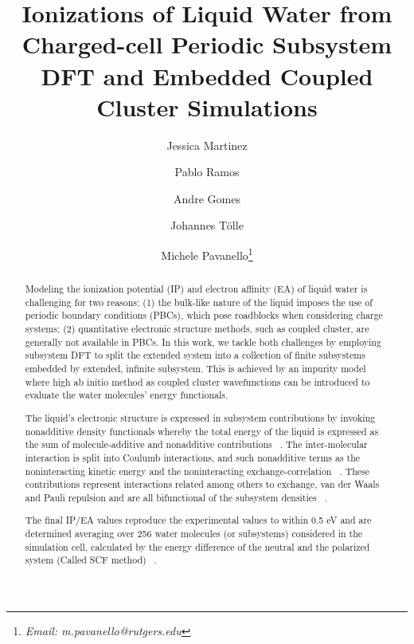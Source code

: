 \documentclass[12pt,a4paper]{article}
\begin{document}
\title{Ionizations of Liquid Water from Charged-cell Periodic Subsystem DFT and Embedded Coupled Cluster Simulations}
\author[1]{Jessica Martinez}
\author[1]{Pablo Ramos}
\author[2]{Andre Gomes}
\author[3]{Johannes Tölle}
\author[1]{Michele Pavanello\thanks{\textit{Email: m.pavanello@rutgers.edu}}}
\date{}
\setcounter{Maxaffil}{0}
\renewcommand\Affilfont{\itshape\small}
\begin{titlepage}
  \maketitle
\end{titlepage}

\begin{abstract}
Modeling the ionization potential (IP) and electron affinity (EA) of liquid water is challenging for
two reasons: (1) the bulk-like nature of the liquid imposes the use of periodic boundary conditions
(PBCs), which pose roadblocks when considering charge systems; (2) quantitative electronic structure
methods, such as coupled cluster, are generally not available in PBCs. In this work, we tackle both
challenges by employing subsystem DFT to split the extended system into a collection of finite
subsystems embedded by extended, infinite subsystem. This is achieved by an impurity
model ~\cite{tolle2019charged} where high ab initio method as coupled cluster wavefunctions can be introduced to evaluate
the water molecules’ energy functionals. 

The liquid’s electronic structure is expressed in subsystem contributions by invoking nonadditive density 
functionals whereby the total energy of the liquid is expressed as the sum of molecule-additive
and nonadditive contributions ~\cite{krishtal2015subsystem}. The inter-molecular interaction is
split into Coulumb interactions, and such nonadditive terms as the noninteracting
kinetic energy and the noninteracting exchange-correlation ~\cite{krishtal2015subsystem}. 
These contributions represent interactions related among others to exchange, van der Waals and
Pauli repulsion and are all bifunctional of the subsystem densities ~\cite{tolle2019charged}. 

The final IP/EA values reproduce the experimental values to within 0.5 eV and are determined averaging 
over 256 water molecules (or subsystems) considered in the simulation cell, calculated by the energy difference of the
neutral and the polarized system (Called SCF method) ~\cite{bagus1965self,waskom2017mwaskom}. 
\end{abstract}
\end{document}
